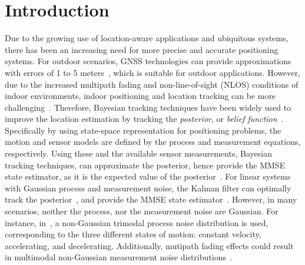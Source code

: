 \documentclass[10pt,twocolumn,twoside]{IEEEtran}
\newcommand{\corcol}[1]{\textcolor{CorCol}{#1}}
\begin{document}
\section{Introduction}
Due to the growing use of location-aware applications and ubiquitous systems, there has been an increasing need for more precise and accurate positioning systems. For outdoor scenarios, GNSS technologies can provide approximations with errors of 1 to 5 meters~\cite{hightower_location_2001}, which is suitable for outdoor applications. However, due to the increased multipath fading and non-line-of-\corcol{sight} (NLOS) conditions of indoor environments, indoor positioning and location tracking can be more challenging~\cite{pahlavan_indoor_2002}. Therefore, Bayesian tracking techniques have been widely used to improve the location estimation by tracking the \textit{posterior}, or \textit{belief function}~\cite{fox_bayesian_2003}. Specifically by using state-space representation for positioning problems, the motion and sensor models are defined by the process and measurement equations, respectively. Using these and the available sensor measurements, Bayesian tracking techniques, can approximate the posterior, hence provide the MMSE state estimator, as it is the expected value of the posterior~\cite{poor_introduction_1994,bar2001estimation}. For linear systems with Gaussian process and measurement noise, \corcol{the} Kalman filter can optimally track the posterior~\cite{ho_bayesian_1964,arulampalam_tutorial_2002}, and provide the MMSE state estimator~\cite{anderson1979optimal}. However, in many scenarios, neither the process, nor the measurement noise are Gaussian. For instance, in~\cite{pishdad_optimal_2013}, a non-Gaussian trimodal process noise distribution is used, corresponding to the three different states of motion: constant velocity, accelerating, and decelerating. Additionally, mutipath fading effects could result in multimodal non-Gaussian measurement noise distributions~\cite{pishdad_indoor_2012,pishdad_optimal_2013,kung-chung_lee_comparison_2010}.
\end{document}
